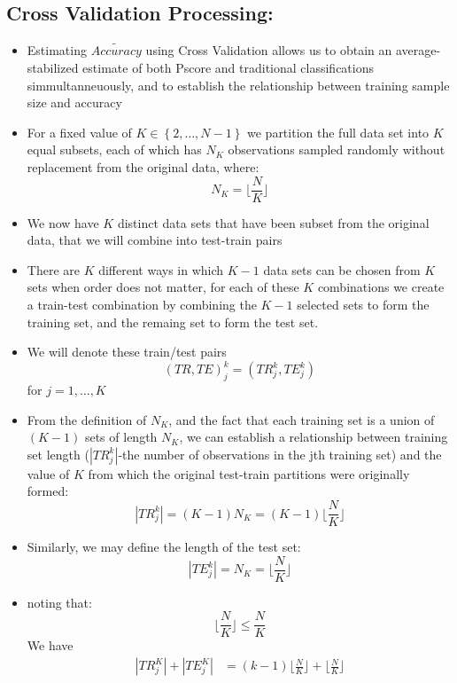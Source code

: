 \documentclass[12pt,]{article}
\providecommand{\tightlist}{%
  \setlength{\itemsep}{0pt}\setlength{\parskip}{0pt}}
\begin{document}
\hypertarget{cross-validation-processing}{%
\subsection{Cross Validation
Processing:}\label{cross-validation-processing}}

\begin{itemize}
\tightlist
\item
  Estimating \(\tilde{Accuracy}\) using Cross Validation allows us to
  obtain an average-stabilized estimate of both Pscore and traditional
  classifications simmultanneuously, and to establish the relationship
  between training sample size and accuracy
\item
  For a fixed value of \(K \in \left \{ 2, \ldots, N-1 \right \}\) we
  partition the full data set into \(K\) equal subsets, each of which
  has \(N_{K}\) observations sampled randomly without replacement from
  the original data, where:
  \[N_{K}=\Big \lfloor \frac{N}{K} \Big \rfloor\]
\item
  We now have \(K\) distinct data sets that have been subset from the
  original data, that we will combine into test-train pairs
\item
  There are \(K\) different ways in which \(K-1\) data sets can be
  chosen from \(K\) sets when order does not matter, for each of these
  \(K\) combinations we create a train-test combination by combining the
  \(K-1\) selected sets to form the training set, and the remaing set to
  form the test set.
\item
  We will denote these train/test pairs
  \[\left(TR, TE \right)^{k}_{j}=\left(TR_{j}^{k}, TE_{j}^{k} \right) \]
  for \(j=1, \ldots, K\)
\item
  From the definition of \(N_{K}\), and the fact that each training set
  is a union of \(\left(K-1 \right)\) sets of length \(N_{K}\), we can
  establish a relationship between training set length
  (\(|TR_{j}^{k}|\)-the number of observations in the jth training set)
  and the value of \(K\) from which the original test-train partitions
  were originally formed:
  \[|TR_{j}^{k}|=(K-1)N_{K}=(K-1)\Big \lfloor \frac{N}{K} \Big \rfloor\]
\item
  Similarly, we may define the length of the test set:
  \[|TE_{j}^{k}|=N_{K}=\Big \lfloor \frac{N}{K} \Big \rfloor\]
\item
  noting that:
  \[\Big \lfloor \frac{N}{K} \Big \rfloor \leq \frac{N}{K}\] We have
  \begin{align*}
  |TR_{j}^{K}| + |TE_{j}^{K}| &= (k-1)\Big \lfloor \frac{N}{K} \Big \rfloor + \Big \lfloor \frac{N}{K} \Big \rfloor \\[0.5em]

\end{align*}
\end{itemize}
\end{document}
